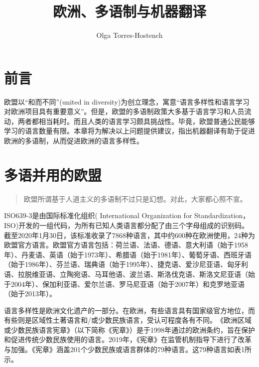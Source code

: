 \documentclass[output=paper]{langscibook}
\author{Olga Torres-Hostench\affiliation{巴塞罗那自治大学}}
\title{欧洲、多语制与机器翻译}
\begin{document}
\AffiliationsWithoutIndexing{}
\maketitle

\section{前言}\largerpage
‌欧盟以“和而不同”(united in diversity)为创立理念，寓意“语言多样性和语言学习对欧洲项目具有重要意义”\citep{EuropeanCommission2021}。‌但是，欧盟的多语制政策大多基于语言学习和人员流动，两者都相当耗时。‌而且人类的语言学习颇具挑战性。毕竟，欧盟普通公民能够学习的语言数量有限。本章将为解决以上问题提供建议，指出机器翻译有助于促进欧洲的多语制，从而促进欧洲的语言多样性。

\section{‌多语并用的欧盟}
\begin{quote}
‌欧盟所谓基于人道主义的多语制不过只是幻想。对此，大家都心照不宣。\citep[561]{House2003}
\end{quote}

‌ISO639-3是由国际标准化组织( International Organization for
Standardization，ISO)开发的一组代码，为所有已知人类语言都分配了由三个字母组成的识别码。‌截至2020年1月30日，该标准收录了7868种语言\citep{Wikizero2020}，其中约600种在欧洲使用，24种为欧盟官方语言。欧盟官方语言包括：‌荷兰语、法语、德语、意大利语（始于1958年）、丹麦语、英语（始于1973年）、希腊语（始于1981年）、葡萄牙语、西班牙语（始于1986年）、芬兰语、瑞典语（始于1995年）、捷克语、爱沙尼亚语、匈牙利语、拉脱维亚语、立陶宛语、马耳他语、波兰语、斯洛伐克语、斯洛文尼亚语（始于2004年）、保加利亚语、爱尔兰语、罗马尼亚语（始于2007年）和克罗地亚语（始于2013年）。

‌语言多样性是欧洲文化遗产的一部分。‌在欧洲，有些语言具有国家级官方地位，而有些则是区域性土著语言和/或少数民族语言，受认可程度各有不同。‌《欧洲区域或少数民族语言宪章》（以下简称《宪章》）是于1998年通过的欧洲条约，旨在保护和促进传统少数民族使用的语言。‌2019年，《宪章》在监管机制指导下进行了改革与加强。《宪章》涵盖201个少数民族或语言群体的79种语言\citep{CoE2020}。‌这79种语言如表‌1‌所示‌。
\end{document}
